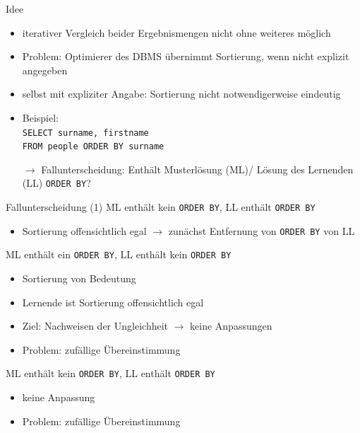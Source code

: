 \documentclass{beamer}
\begin{document}
\begin{frame}[fragile]{Idee}
\begin{itemize}
\item iterativer Vergleich beider Ergebnismengen nicht ohne weiteres möglich
\item Problem: Optimierer des DBMS übernimmt Sortierung, wenn nicht explizit angegeben
\item selbst mit expliziter Angabe: Sortierung nicht notwendigerweise eindeutig
\item Beispiel: \\\verb|SELECT surname, firstname|\\\verb|FROM people ORDER BY surname|
\item[$\to$] Fallunterscheidung: Enthält Musterlösung (ML)/ Lösung des Lernenden (LL) \verb|ORDER BY|?
\end{itemize}
\end{frame}

\begin{frame}[fragile]{Fallunterscheidung (1)}
ML enthält kein \verb|ORDER BY|, LL enthält \verb|ORDER BY|
\begin{itemize}
\item Sortierung offensichtlich egal $\to$ zunächst Entfernung von \verb|ORDER BY| von LL
\end{itemize}

ML enthält ein \verb|ORDER BY|, LL enthält kein \verb|ORDER BY|
\begin{itemize}
\item Sortierung von Bedeutung
\item Lernende ist Sortierung offensichtlich egal
\item Ziel: Nachweisen der Ungleichheit $\to$ keine Anpassungen
\item Problem: zufällige Übereinstimmung
\end{itemize}

ML enthält kein \verb|ORDER BY|, LL enthält \verb|ORDER BY|
\begin{itemize}
\item keine Anpassung
\item Problem: zufällige Übereinstimmung
\end{itemize}
\end{frame}
\end{document}
